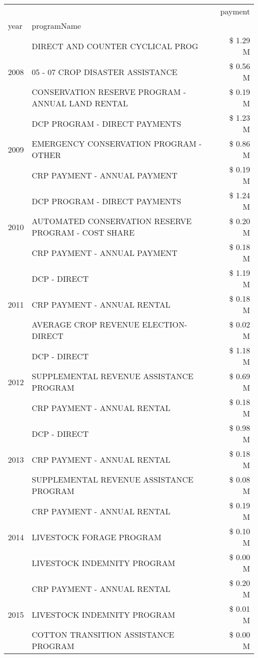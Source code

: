 \begin{tabular}{llr}
\toprule
 &  & payment \\
year & programName &  \\
\midrule
\multirow[t]{3}{*}{2008} & DIRECT AND COUNTER CYCLICAL PROG & \$ 1.29 M \\
 & 05 - 07 CROP DISASTER ASSISTANCE & \$ 0.56 M \\
 & CONSERVATION RESERVE PROGRAM - ANNUAL LAND RENTAL & \$ 0.19 M \\
\cline{1-3}
\multirow[t]{3}{*}{2009} & DCP PROGRAM - DIRECT PAYMENTS & \$ 1.23 M \\
 & EMERGENCY CONSERVATION PROGRAM - OTHER & \$ 0.86 M \\
 & CRP PAYMENT - ANNUAL PAYMENT & \$ 0.19 M \\
\cline{1-3}
\multirow[t]{3}{*}{2010} & DCP PROGRAM - DIRECT PAYMENTS & \$ 1.24 M \\
 & AUTOMATED CONSERVATION RESERVE PROGRAM - COST SHARE & \$ 0.20 M \\
 & CRP PAYMENT - ANNUAL PAYMENT & \$ 0.18 M \\
\cline{1-3}
\multirow[t]{3}{*}{2011} & DCP - DIRECT & \$ 1.19 M \\
 & CRP PAYMENT - ANNUAL RENTAL & \$ 0.18 M \\
 & AVERAGE CROP REVENUE ELECTION-DIRECT & \$ 0.02 M \\
\cline{1-3}
\multirow[t]{3}{*}{2012} & DCP - DIRECT & \$ 1.18 M \\
 & SUPPLEMENTAL REVENUE ASSISTANCE PROGRAM & \$ 0.69 M \\
 & CRP PAYMENT - ANNUAL RENTAL & \$ 0.18 M \\
\cline{1-3}
\multirow[t]{3}{*}{2013} & DCP - DIRECT & \$ 0.98 M \\
 & CRP PAYMENT - ANNUAL RENTAL & \$ 0.18 M \\
 & SUPPLEMENTAL REVENUE ASSISTANCE PROGRAM & \$ 0.08 M \\
\cline{1-3}
\multirow[t]{3}{*}{2014} & CRP PAYMENT - ANNUAL RENTAL & \$ 0.19 M \\
 & LIVESTOCK FORAGE PROGRAM & \$ 0.10 M \\
 & LIVESTOCK INDEMNITY PROGRAM & \$ 0.00 M \\
\cline{1-3}
\multirow[t]{3}{*}{2015} & CRP PAYMENT - ANNUAL RENTAL & \$ 0.20 M \\
 & LIVESTOCK INDEMNITY PROGRAM & \$ 0.01 M \\
 & COTTON TRANSITION ASSISTANCE PROGRAM & \$ 0.00 M \\

\end{tabular}
